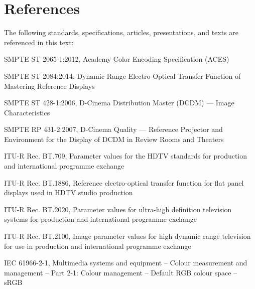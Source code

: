 \numberedformat
\chapter{References}
The following standards, specifications, articles, presentations, and texts are referenced in this text:

SMPTE ST 2065-1:2012, Academy Color Encoding Specification (ACES)

SMPTE ST 2084:2014, Dynamic Range Electro-Optical Transfer Function of Mastering Reference Displays

SMPTE ST 428-1:2006, D-Cinema Distribution Master (DCDM) — Image Characteristics

SMPTE RP 431-2:2007, D-Cinema Quality — Reference Projector and Environment for the Display of DCDM in Review Rooms and Theaters

ITU-R Rec. BT.709, Parameter values for the HDTV standards for production and international programme exchange 

ITU-R Rec. BT.1886, Reference electro-optical transfer function for flat panel displays used in HDTV studio production

ITU-R Rec. BT.2020, Parameter values for ultra-high definition television systems for production and international programme exchange

ITU-R Rec. BT.2100, Image parameter values for high dynamic range television for use in production and international programme exchange

IEC 61966-2-1, Multimedia systems and equipment -- Colour measurement and management -- Part 2-1: Colour management -- Default RGB colour space -- sRGB